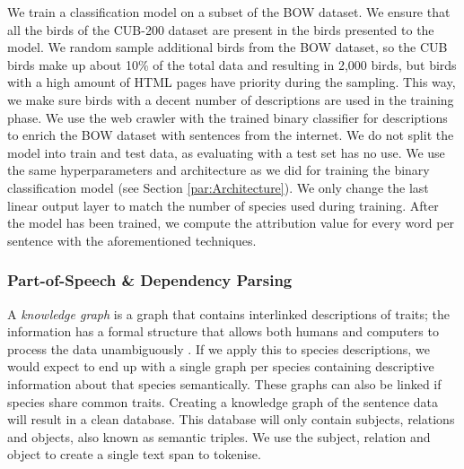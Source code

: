 \documentclass[a4paper, 12pt, oneside]{book} %
\begin{document}
We train a classification model on a subset of the BOW dataset.
We ensure that all the birds of the CUB-200 dataset are present in the birds presented to the model.
We random sample additional birds from the BOW dataset, so the CUB birds make up about 10\% of the total data and resulting in 2,000 birds, but birds with a high amount of HTML pages have priority during the sampling.
This way, we make sure birds with a decent number of descriptions are used in the training phase.
We use the web crawler with the trained binary classifier for descriptions to enrich the BOW dataset with sentences from the internet.
We do not split the model into train and test data, as evaluating with a test set has no use.
We use the same hyperparameters and architecture as we did for training the binary classification model (see Section \ref{par:Architecture}).
We only change the last linear output layer to match the number of species used during training.
After the model has been trained, we compute the attribution value for every word per sentence with the aforementioned techniques.

\subsubsection{Part-of-Speech \& Dependency Parsing} \label{par:PoS}
A \textit{knowledge graph} is a graph that contains interlinked descriptions of traits; the information has a formal structure that allows both humans and computers to process the data unambiguously \autocite{petkova_crafting_2020}.
If we apply this to species descriptions, we would expect to end up with a single graph per species containing descriptive information about that species semantically.
These graphs can also be linked if species share common traits.
Creating a knowledge graph of the sentence data will result in a clean database.
This database will only contain subjects, relations and objects, also known as semantic triples. 
We use the subject, relation and object to create a single text span to tokenise.
\end{document}

